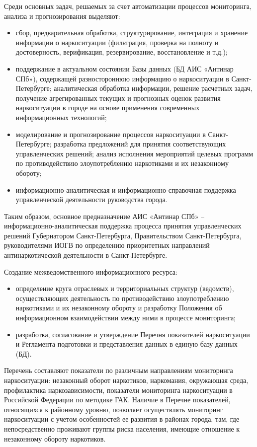 Среди основных задач, решаемых за счет автоматизации процессов мониторинга,
анализа и прогнозирования выделяют:
\begin{itemize}
\item сбор, предварительная обработка, структурирование, интеграция и хранение
информации о наркоситуации (фильтрация, проверка на полноту и достоверность,
верификация, резервирование, восстановление и т.д.);
\item поддержание в актуальном состоянии Базы данных (БД АИС «Антинар СПб»),
содержащей разностороннюю информацию о наркоситуации в Санкт-Петербурге;
аналитическая обработка информации, решение расчетных задач, получение
агрегированных текущих и прогнозных оценок развития наркоситуации в городе на
основе применения современных информационных технологий;
\item моделирование и прогнозирование процессов наркоситуации в Санкт-Петербурге;
разработка предложений для принятия соответствующих управленческих решений;
анализ исполнения мероприятий целевых программ по противодействию
злоупотреблению наркотиками и их незаконному обороту;
\item информационно-аналитическая и информационно-справочная поддержка
управленческой деятельности руководства города.
\end{itemize}
Таким образом, основное предназначение АИС «Антинар СПб» –
информационно-аналитическая поддержка процесса принятия управленческих решений
Губернатором Санкт-Петербурга, Правительством Санкт-Петербурга, руководителями
ИОГВ по определению приоритетных направлений антинаркотической деятельности в
Санкт-Петербурге. 

Создание межведомственного информационного ресурса:
\begin{itemize}
\item определение круга отраслевых и территориальных структур (ведомств),
осуществляющих деятельность по противодействию злоупотреблению наркотиками и их
незаконному обороту и  разработку Положения об информационном взаимодействии
между ними в процессе мониторинга;
\item разработка, согласование и утверждение Перечня показателей наркоситуации и
Регламента подготовки и представления данных в единую базу данных (БД). 
\end{itemize}
Перечень составляют показатели по различным направлениям мониторинга
наркоситуации: незаконный оборот наркотиков, наркомания, окружающая среда,
профилактика наркозависимости, показатели мониторинга наркоситуации в Российской
Федерации по методике ГАК. Наличие в Перечне показателей, относящихся к
районному уровню, позволяет осуществлять мониторинг наркоситуации с учетом
особенностей ее развития в районах города, там, где непосредственно проживают
группы риска населения, имеющие отношение к незаконному обороту наркотиков. 


